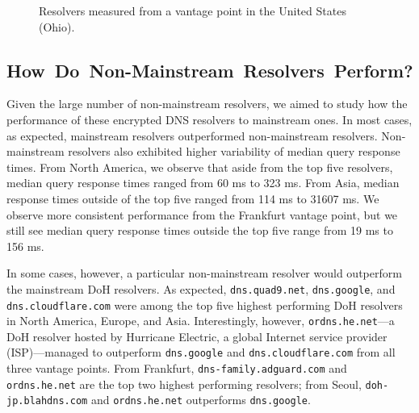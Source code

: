 \begin{figure}[t!]
\begin{minipage}{1.35\textwidth}
    \caption{Resolvers measured from a vantage point in the United States (Ohio).}
\end{minipage}
\end{figure}

\subsection{\mbox{How Do Non-Mainstream Resolvers Perform?}}

Given the large number of non-mainstream resolvers, we aimed to study how
the performance of these encrypted DNS resolvers to mainstream ones.
In most cases, as expected, mainstream resolvers outperformed non-mainstream resolvers.
Non-mainstream resolvers also exhibited higher variability of 
median query response times.  
From North America, we observe that aside from the top five resolvers,
median query response times ranged from 
60 ms to 323 ms. From Asia, median response times outside
of the top five ranged from 114 ms to 31607 ms. We observe more
consistent performance from the Frankfurt vantage point, but we still
see median query response times outside the top five range from 19 ms to
156 ms.

In some cases, however, a particular non-mainstream resolver would outperform
the mainstream DoH resolvers.  As expected, \texttt{dns.quad9.net},
\texttt{dns.google}, and \texttt{dns.cloudflare.com} were among the top five
highest performing DoH resolvers in North America, Europe, and Asia.
Interestingly, however, \texttt{ordns.he.net}---a DoH resolver hosted by
Hurricane Electric, a global Internet service provider (ISP)---managed to
outperform \texttt{dns.google} and \texttt{dns.cloudflare.com} from all three
vantage points.  From Frankfurt, \texttt{dns-family.adguard.com} and
\texttt{ordns.he.net} are the top two highest performing resolvers; from
Seoul, \texttt{doh-jp.blahdns.com} and \texttt{ordns.he.net} outperforms \texttt{dns.google}.

